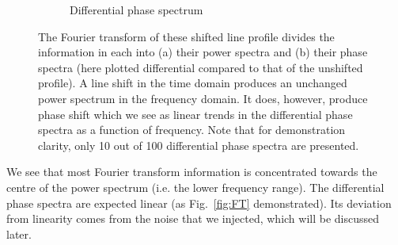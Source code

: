 \begin{figure}[tbp]
\begin{subfigure}[b]{0.49\textwidth}
        \caption{Differential phase spectrum}
        \label{fig:dps}
    \end{subfigure}	
    \caption[Fourier transform of 100 shifted line profiles]
    {The Fourier transform of these shifted line profile divides the information in each into (a) their power spectra and (b) their phase spectra (here plotted differential compared to that of the unshifted profile). A line shift in the time domain produces an unchanged power spectrum in the frequency domain. It does, however, produce phase shift which we see as linear trends in the differential phase spectra as a function of frequency. Note that for demonstration clarity, only 10 out of 100 differential phase spectra are presented.}
\label{fig:FT_process}
\end{figure}    


We see that most Fourier transform information is concentrated towards the centre of the power spectrum (i.e. the lower frequency range). The differential phase spectra are expected linear (as Fig.~\ref{fig:FT} demonstrated). Its deviation from linearity comes from the noise that we injected, which will be discussed later. 


